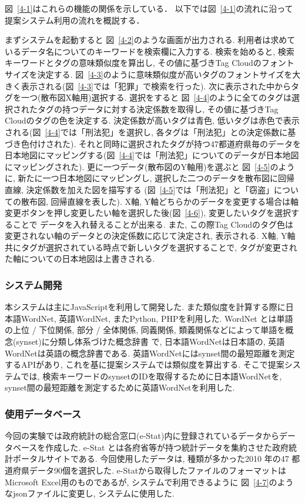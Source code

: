 \documentclass[sotsuron]{kuee}
\begin{document}
図~\ref{4-1}はこれらの機能の関係を示している．
以下では図~\ref{4-1}の流れに沿って提案システム利用の流れを概説する．

まずシステムを起動すると
図~\ref{4-2}のような画面が出力される. 利用者は求めているデータ名についてのキーワードを検索欄に入力する.
検索を始めると, 検索キーワードとタグの意味類似度を算出し, その値に基づきTag Cloudのフォントサイズを決定する.
図~\ref{4-3}のように意味類似度が高いタグのフォントサイズを大きく表示される(図~\ref{4-3}では「犯罪」で検索を行った).
次に表示された中からタグを一つ(散布図X軸用)選択する. 選択をすると
図~\ref{4-4}のように全てのタグは選択されたタグの持つデータに対する決定係数を取得し, その値に基づきTag Cloudのタグの色を決定する.
決定係数が高いタグは青色, 低いタグは赤色で表示される(図~\ref{4-4}では「刑法犯」を選択し, 各タグは「刑法犯」との決定係数に基づき色付けされた).
それと同時に選択されたタグが持つ47都道府県毎のデータを日本地図にマッピングする(図~\ref{4-4}では「刑法犯」についてのデータが日本地図にマッピングされた).
更に一つデータ(散布図のY軸用)を選ぶと
図~\ref{4-5}のように, 新たに一つ日本地図にマッピングし, 選択した二つのデータを散布図に回帰直線, 決定係数を加えた図を描写する
(図~\ref{4-5}では「刑法犯」と「窃盗」についての散布図, 回帰直線を表した).
X軸, Y軸どちらかのデータを変更する場合は軸変更ボタンを押し変更したい軸を選択した後(図~\ref{4-6}), 変更したいタグを選択することで
データを入れ替えることが出来る. また, この際Tag Cloudのタグ色は変更されない軸のデータとの決定係数に応じて決定され, 表示される.
X軸, Y軸共にタグが選択されている時点で新しいタグを選択することで, タグが変更された軸についての日本地図は上書きされる.

\subsubsection{システム開発}
本システムは主にJavaScriptを利用して開発した. また類似度を計算する際に日本語WordNet, 英語WordNet, またPython, PHPを利用した.
WordNet とは単語の上位 / 下位関係, 部分 / 全体関係, 同義関係, 類義関係などによって単語を概念(synset)に分類し体系づけた概念辞書
\cite{3.1-1}で,
日本語WordNetは日本語の, 英語WordNetは英語の概念辞書である.
英語WordNetにはsynset間の最短距離を測定するAPIがあり, これを基に提案システムでは類似度を算出する.
そこで提案システムでは, 検索キーワードのsynsetのIDを取得するために日本語WordNetを, synset間の最短距離を測定するために英語WordNetを利用した.

\subsubsection{使用データベース}
今回の実験では政府統計の総合窓口(e-Stat)内に登録されているデータからデータベースを作成した. e-Stat とは各府省等が持つ統計データを集約させた政府統計ポータルサイトである.
今回使用したデータは, 種類が多かった2010 年の47 都道府県データ90個を選択した.
e-Statから取得したファイルのフォーマットはMicrosoft Excel用のものであるが, システムで利用できるように
図~\ref{4-7}のようなjsonファイルに変更し, システムに使用した.
\end{document}
